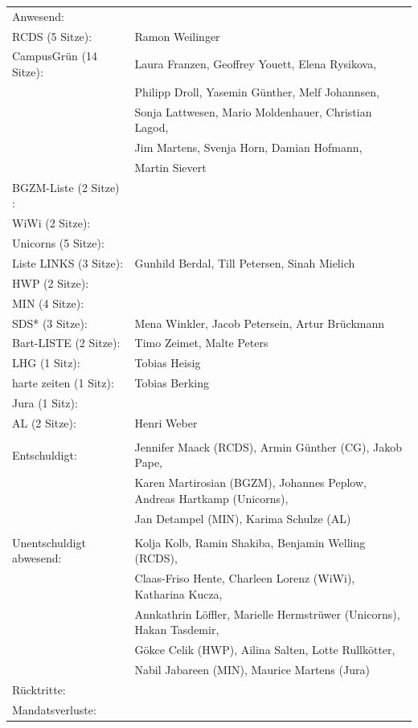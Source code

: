 \documentclass[ngerman,headheight=70pt]{scrartcl}
\begin{document}
    \begin{tabular}{ll}
        Anwesend: & \\
            RCDS (5 Sitze): & Ramon Weilinger \\
             CampusGrün (14 Sitze): & Laura Franzen, Geoffrey Youett, Elena Rysikova, \\
                                   & Philipp Droll, Yasemin Günther, Melf Johannsen, \\
                                   & Sonja Lattwesen, Mario Moldenhauer, Christian Lagod, \\
                                   & Jim Martens, Svenja Horn, Damian Hofmann, \\
                                   & Martin Sievert  \\
             BGZM-Liste (2 Sitze) : & \\
             WiWi (2 Sitze): & \\
             Unicorns (5 Sitze): &  \\
             Liste LINKS (3 Sitze): & Gunhild Berdal, Till Petersen, Sinah Mielich \\
             HWP (2 Sitze): &  \\
             MIN (4 Sitze): &  \\
             SDS* (3 Sitze): & Mena Winkler, Jacob Petersein, Artur Brückmann \\
             Bart-LISTE (2 Sitze): & Timo Zeimet, Malte Peters \\
             LHG (1 Sitz): & Tobias Heisig \\
             harte zeiten (1 Sitz): & Tobias Berking \\
             Jura (1 Sitz): & \\
             AL (2 Sitze): & Henri Weber \\
            & \\
        Entschuldigt: & Jennifer Maack (RCDS), Armin Günther (CG), Jakob Pape, \\
                      & Karen Martirosian (BGZM), Johannes Peplow, Andreas Hartkamp (Unicorns), \\
                      & Jan Detampel (MIN), Karima Schulze (AL)\\
                      &\\
        Unentschuldigt abwesend: & Kolja Kolb, Ramin Shakiba, Benjamin Welling (RCDS), \\
                                & Claas-Friso Hente, Charleen Lorenz (WiWi), Katharina Kucza, \\
                                & Annkathrin Löffler, Marielle Hermstrüwer (Unicorns), Hakan Tasdemir, \\
                                & Gökce Celik (HWP), Ailina Salten, Lotte Rullkötter, \\
                                & Nabil Jabareen (MIN), Maurice Martens (Jura)\\
        Rücktritte: & \\
        Mandatsverluste: & \\
    \end{tabular}
\end{document}
